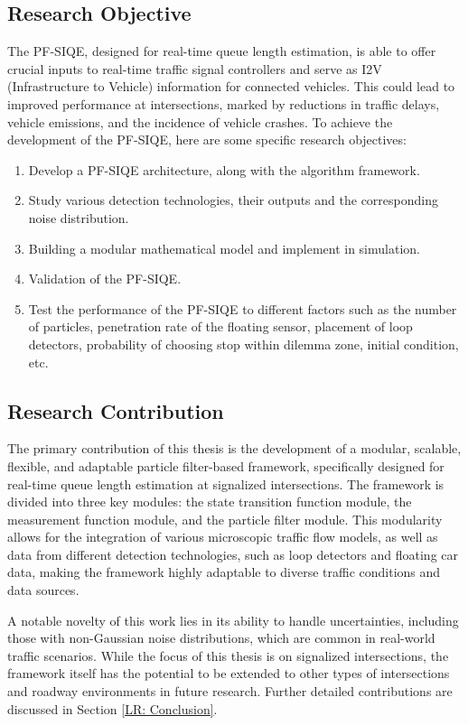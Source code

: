 \subsection{Research Objective}
The PF-SIQE, designed for real-time queue length estimation, is able to offer crucial inputs to real-time traffic signal controllers and serve as I2V (Infrastructure to Vehicle) information for connected vehicles. This could lead to improved performance at intersections, marked by reductions in traffic delays, vehicle emissions, and the incidence of vehicle crashes.
To achieve the development of the PF-SIQE, here are some specific research objectives:
\begin{enumerate}
  \item Develop a PF-SIQE architecture, along with the algorithm framework.
  \item Study various detection technologies, their outputs and the corresponding noise distribution.
  \item Building a modular mathematical model and implement in simulation.
  \item Validation of the PF-SIQE.
  \item Test the performance of the PF-SIQE to different factors such as the number of particles, penetration rate of the floating sensor, placement of loop detectors, probability of choosing stop within dilemma zone, initial condition, etc.
\end{enumerate}
\subsection{Research Contribution}
The primary contribution of this thesis is the development of a modular, scalable, flexible, and adaptable particle filter-based framework, specifically designed for real-time queue length estimation at signalized intersections. The framework is divided into three key modules: the state transition function module, the measurement function module, and the particle filter module. This modularity allows for the integration of various microscopic traffic flow models, as well as data from different detection technologies, such as loop detectors and floating car data, making the framework highly adaptable to diverse traffic conditions and data sources. 

A notable novelty of this work lies in its ability to handle uncertainties, including those with non-Gaussian noise distributions, which are common in real-world traffic scenarios. While the focus of this thesis is on signalized intersections, the framework itself has the potential to be extended to other types of intersections and roadway environments in future research. Further detailed contributions are discussed in Section \ref{LR: Conclusion}.

